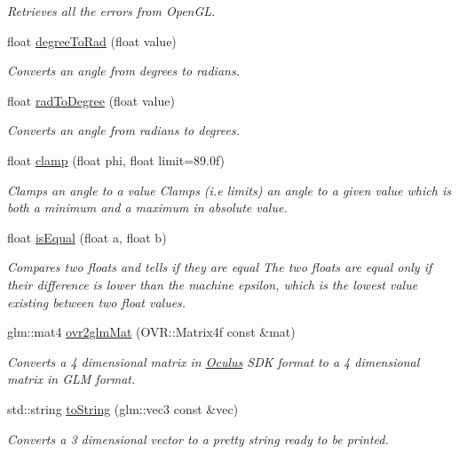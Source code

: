 \begin{DoxyCompactItemize}
\begin{DoxyCompactList}\small\item\em Retrieves all the errors from Open\+G\+L. \end{DoxyCompactList}\item 
float \hyperlink{namespaceUtils_aa1bf98827f90b3843660995e4efb4c84}{degree\+To\+Rad} (float value)
\begin{DoxyCompactList}\small\item\em Converts an angle from degrees to radians. \end{DoxyCompactList}\item 
float \hyperlink{namespaceUtils_aa9b1255584f0bb41fa3795c7d79eff9f}{rad\+To\+Degree} (float value)
\begin{DoxyCompactList}\small\item\em Converts an angle from radians to degrees. \end{DoxyCompactList}\item 
float \hyperlink{namespaceUtils_ac77440fa22cefff120355abc5e6f6de8}{clamp} (float phi, float limit=89.\+0f)
\begin{DoxyCompactList}\small\item\em Clamps an angle to a value Clamps (i.\+e limits) an angle to a given value which is both a minimum and a maximum in absolute value. \end{DoxyCompactList}\item 
float \hyperlink{namespaceUtils_ae1843c4bace4f7ae8cae0fe9e3e560c2}{is\+Equal} (float a, float b)
\begin{DoxyCompactList}\small\item\em Compares two floats and tells if they are equal The two floats are equal only if their difference is lower than the machine epsilon, which is the lowest value existing between two float values. \end{DoxyCompactList}\item 
glm\+::mat4 \hyperlink{namespaceUtils_a21c9fd68d394fd4148a5a4e7064b7b5a}{ovr2glm\+Mat} (O\+V\+R\+::\+Matrix4f const \&mat)
\begin{DoxyCompactList}\small\item\em Converts a 4 dimensional matrix in \hyperlink{classOculus}{Oculus} S\+D\+K format to a 4 dimensional matrix in G\+L\+M format. \end{DoxyCompactList}\item 
std\+::string \hyperlink{namespaceUtils_aae7fe80e12cf4342629d49803946568d}{to\+String} (glm\+::vec3 const \&vec)
\begin{DoxyCompactList}\small\item\em Converts a 3 dimensional vector to a pretty string ready to be printed. \end{DoxyCompactList}\item 

\end{DoxyCompactItemize}
